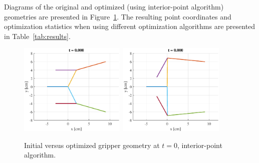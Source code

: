 \documentclass{article}
\begin{document}
Diagrams of the original and optimized (using interior-point algorithm) geometries are presented in Figure~\ref*{fig:geometry}. The resulting point coordinates and optimization statistics when using different optimization algorithms are presented in Table~\ref*{tab:results}.

\begin{figure}[htb]
	\centering
	\includegraphics[width=0.45\textwidth]{unoptimized.eps}~\includegraphics[width=0.45\textwidth]{optimized.eps}
	\caption{Initial versus optimized gripper geometry at $t = 0$, interior-point algorithm.\label{fig:geometry}}
\end{figure}
\end{document}
